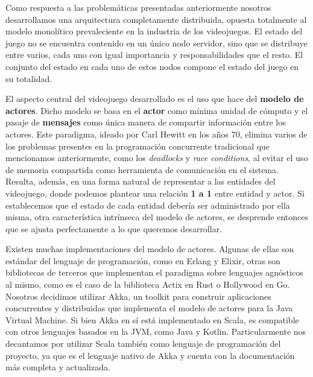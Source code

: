 
\noindent Como respuesta a las problemáticas presentadas anteriormente nosotros desarrollamos una arquitectura
completamente distribuida, opuesta totalmente al modelo monolítico prevaleciente en la industria de los videojuegos. 
El estado del juego no se encuentra contenido en un único nodo servidor, sino que se distribuye entre varios, cada uno con igual importancia y responsabilidades que el resto. El conjunto del estado en cada uno de estos nodos compone el 
estado del juego en su totalidad.

El aspecto central del videojuego desarrollado es el uso que hace del \textbf{modelo de actores}.
Dicho modelo se basa en el \textbf{actor} como mínima unidad de cómputo y el pasaje de \textbf{mensajes} como única manera
de compartir información entre los actores. Este paradigma, ideado por Carl Hewitt en los años 70, elimina varios de los problemas presentes
en la programación concurrente tradicional que mencionamos anteriormente, como
los \textit{deadlocks} y \textit{race conditions}, al evitar el uso de memoria compartida
como herramienta de comunicación en el sistema. Resulta, además, en una forma natural de representar a las entidades del videojuego, donde podemos plantear una 
relación \textbf{1 a 1} entre entidad y actor. Si establecemos que el estado de cada entidad 
debería ser administrado por ella misma, otra característica intrínseca del modelo de actores,
se desprende entonces que se ajusta perfectamente a lo que queremos desarrollar.

Existen muchas implementaciones del modelo de actores. Algunas de ellas son estándar del lenguaje de programación,
como en Erlang y Elixir, otras son bibliotecas de terceros que implementan el paradigma sobre lenguajes
agnósticos al mismo, como es el caso de la biblioteca Actix en Rust o Hollywood en Go.
Nosotros decidimos utilizar Akka, un toolkit para construir aplicaciones concurrentes
y distribuidas que implementa el modelo de actores para la Java Virtual Machine.
Si bien Akka en sí está implementado en Scala, es compatible con otros lenguajes
basados en la JVM, como Java y Kotlin. Particularmente nos decantamos por utilizar Scala también
como lenguaje de programación del proyecto, ya que es el lenguaje nativo de Akka y cuenta con la documentación
más completa y actualizada.

